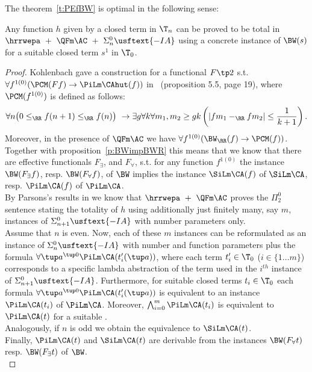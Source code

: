 The theorem~\ref{t:PEfBW} is optimal in the following sense:
%
\begin{prop}\label{p:optPEfBW}
Any function $h$ given by a closed term in $\T_n$ can be proved to be total
in $\hrrwepa\ +\ \QFm\AC\ +\ \Sigma^0_n\usftext{-IA}$ using a concrete instance of
$\BW(s)$ for a suitable closed term $s^1$ in $\T_0$.
\end{prop}
%
{\samepage
\begin{proof}
%
Kohlenbach gave a construction for a
functional $F\tp2$ s.t. $\forall f^{1(0)}(\PCM(Ff)\rightarrow\PiLm\CAhut(f))$ 
 in~\cite{Kohlenbach00} (proposition 5.5, page 19), 
where $\PCM(f^{1(0)})$ is defined as follows:
\[
\forall n\big(0\leq_\RR f(n+1)\leq_\RR f(n)\big)\ \rightarrow 
       \exists g\forall k\forall m_1,m_2\geq gk\left(|fm_1-_\RR fm_2|\leq\frac{1}{k+1}\right)
\text{.}
\]
 Moreover, in the presence of $\QFm\AC$
we have $\forall f^{1(0)}( \BW_\RR(f) \rightarrow\PCM(f) )$. Together
with proposition~\ref{p:BWimpBWR} this means that we
 know that there are effective functionals $F_\exists$, and $F_\forall$, s.t. for any
function $f^{1(0)}$ the instance $\BW(F_\exists f)$, resp. $\BW(F_\forall f)$, 
of $\BW$ implies the instance $\SiLm\CA(f)$ of $\SiLm\CA$, resp. $\PiLm\CA(f)$ of $\PiLm\CA$.\\
%
%
By Parsons's results in \cite{Parsons72} we know that
$\hrrwepa\ +\ \QFm\AC$ proves the $\Pi^0_2$ sentence stating
the totality of $h$ using additionally just finitely many, say $m$, instances
of $\Sigma^0_{n+1}\usftext{-IA}$ with number parameters only.\\
%
Assume that $n$ is even. Now, each of these $m$ instances
can be reformulated 
as an instance of $\Sigma^0_{n}\usftext{-IA}$ with number and function parameters
plus the formula $\forall \tup a^{\tup0} \PiLm\CA(t_i'(\tup a))$, 
where each term $t_i'\in\T_0$ ($i\in\{1\ldots m\}$) corresponds to a specific
lambda abstraction of the term used in the $i^{th}$ instance of $\Sigma^0_{n+1}\usftext{-IA}$. 
Furthermore, for suitable closed terms $t_i\in\T_0$
 each formula $\forall \tup a^{\tup0} \PiLm\CA(t_i'(\tup a))$ is
equivalent to an instance $\PiLm\CA(t_i)$ of $\PiLm\CA$.
Moreover, $\bigwedge^{m}_{i=0} \PiLm\CA(t_i)$ is 
equivalent to $\PiLm\CA(t)$ for a suitable \tsn.\\
Analogously, if $n$ is odd we obtain the equivalence to $\SiLm\CA(t)$.\\
Finally, $\PiLm\CA(t)$ and $\SiLm\CA(t)$ are
derivable from the instances $\BW(F_\forall t)$ resp. $\BW(F_\exists t)$ of $\BW$.\\
\end{proof}
} %
%

